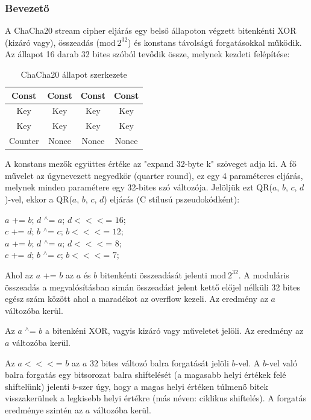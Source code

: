 \documentclass[hidelinks, 12pt]{article}
\begin{document}
	\subsubsection*{Bevezető}
	A ChaCha20 stream cipher eljárás egy belső állapoton végzett bitenkénti XOR (kizáró vagy), összeadás ($ \textrm{mod} \ 2^{32}$) és konstans távolságú forgatásokkal működik. Az állapot 16 darab 32 bites szóból tevődik össze, melynek kezdeti felépítése:
	
	\begin{table}[h]
	\centering
		\begin{tabular}{|c|c|c|c|}
			\hline
			\rowcolor{yellow}Const&Const&Const&Const\\\hline
			\rowcolor[rgb]{0.04313,0.7137,1} Key&Key&Key&Key\\\hline
			\rowcolor[rgb]{0.04313,0.7137,1} Key&Key&Key&Key\\\hline
			\cellcolor[rgb]{1,0.3686,0.3686}Counter& \cellcolor[rgb]{0,1, 0.26}Nonce&\cellcolor[rgb]{0,1, 0.26}Nonce&\cellcolor[rgb]{0,1, 0.26}Nonce\\\hline
		\end{tabular}
	\caption{ChaCha20 állapot szerkezete}
	\end{table}
	A konstans mezők együttes értéke az "expand 32-byte k" szöveget adja ki. A fő művelet az úgynevezett negyedkör (quarter round), ez egy 4 paraméteres eljárás, melynek minden paramétere egy 32-bites szó változója. Jelöljük ezt QR($a$, $b$, $c$, $d$)-vel, ekkor a QR($a$, $b$, $c$, $d$) eljárás (C stílusú pszeudokódként):
	\begin{center}
	$a$ += $b$; $d$ $^\wedge$= $a$; $d <<<$= $16$; \\
	$c$ += $d$; $b$ $^\wedge$= $c$; $b <<<$= $12$; \\
	$a$ += $b$; $d$ $^\wedge$= $a$; $d <<<$= $8$; \\
	$c$ += $d$; $b$ $^\wedge$= $c$; $b <<<$= $7$;
	\end{center}
	Ahol az $a$ += $b$ az $a$ és $b$ bitenkénti összeadását jelenti $\textrm{mod}\ 2^{32}$. A moduláris összeadás a megvalósításban simán összeadást jelent kettő előjel nélküli 32 bites egész szám között ahol a maradékot az overflow kezeli. Az eredmény az $a$ változóba kerül.
	
	Az $a$ $^\wedge$= $b$ a bitenkéni XOR, vagyis kizáró vagy műveletet jelöli. Az eredmény az $a$ változóba kerül.
	
	Az $a <<<$= $b$ az $a$ 32 bites változó balra forgatását jelöli $b$-vel. A $b$-vel való balra forgatás egy bitsorozat balra shiftelését (a magasabb helyi értékek felé shiftelünk) jelenti $b$-szer úgy, hogy a magas helyi értéken túlmenő bitek visszakerülnek a legkisebb helyi értékre (más néven: ciklikus shiftelés). A forgatás eredménye szintén az $a$ változóba kerül.
\end{document}
